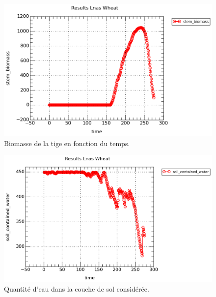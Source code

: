 \begin{figure}[H]

\begin{center}
 \includegraphics[scale = 0.67]{./img/stem.png}
 \caption{Biomasse de la tige en fonction du temps.}
 \label{fig:resultatStem}
\end{center}

\end{figure}

\begin{figure}[H]

\begin{center}
 \includegraphics[scale = 0.67]{./img/water.png}
 \caption{Quantité d'eau dans la couche de sol considérée.}
 \label{fig:resultatWater}
\end{center}
\end{figure}

